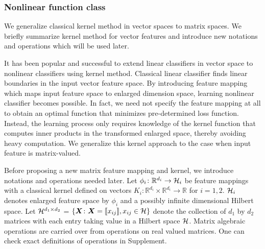 \documentclass[12pt]{article}
\begin{document}
\subsubsection{Nonlinear function class}\label{subsec:nonlinear class}
We generalize classical kernel method in vector spaces to matrix spaces. We briefly summarize kernel method for vector features and introduce new notations and operations which will be used later.

It has been popular and successful to extend linear classifiers in vector space to nonlinear classifiers using kernel method. Classical linear classifier finds linear boundaries in the input vector feature space. By introducing feature mapping which maps input feature space to enlarged dimension space, learning nonlinear classifier becomes possible. In fact, we need not specify the feature mapping at all to obtain an optimal function that minimizes pre-determined loss function. Instead, the learning process only requires knowledge of the kernel function that computes inner products in the transformed enlarged space, thereby avoiding heavy computation. We generalize this kernel approach to the case when input feature is matrix-valued.


Before proposing a new matrix feature mapping and kernel, we introduce notations and operations needed later. Let $\phi_i\colon\mathbb{R}^{d_i}\rightarrow \mathcal{H}_i$ be feature mappings with a classical kernel defined on vectors $K_i\colon\mathbb{R}^{d_i}\times \mathbb{R}^{d_i}\rightarrow \mathbb{R}$ for $i = 1,2.$ $\mathcal{H}_i$ denotes enlarged feature space by $\phi_i$ and a possibly infinite dimensional Hilbert space.  Let $\mathcal{H}^{d_1\times d_2}$ = $\{\bm X\colon\bm X = \llbracket x_{ij} \rrbracket,x_{ij}\in\mathcal{H}\}$ denote the collection of $d_1$ by $d_2$ matrices with each entry taking value in a Hilbert space $\mathcal{H}$.   Matrix algebraic operations are carried over from operations on real valued matrices. One can check exact definitions of operations in Supplement.
\end{document}
